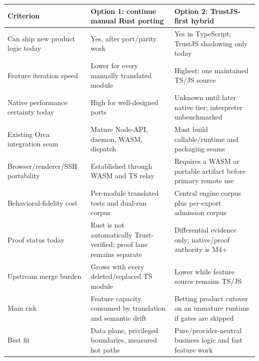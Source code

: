 \documentclass[
  10pt,
  letterpaper,
]{article}
\newcounter{none} %
\begin{document}
{\def\LTcaptype{none} %
\begin{longtable}[]{@{}
  >{\raggedright\arraybackslash}p{}
  >{\raggedright\arraybackslash}p{}
  >{\raggedright\arraybackslash}p{}@{}}
\toprule\noalign{}
\rowcolor{accent!12}
\begin{minipage}[b]{\linewidth}\raggedright
Criterion
\end{minipage} & \begin{minipage}[b]{\linewidth}\raggedright
Option 1: continue manual Rust porting
\end{minipage} & \begin{minipage}[b]{\linewidth}\raggedright
Option 2: TrustJS-first hybrid
\end{minipage} \\
\midrule\noalign{}
\endhead
\bottomrule\noalign{}
\endlastfoot
Can ship new product logic today & Yes, after port/parity work & Yes in
TypeScript; TrustJS shadowing only today \\
Feature iteration speed & Lower for every manually translated module &
Highest: one maintained TS/JS source \\
Native performance certainty today & High for well-designed ports &
Unknown until later native tier; interpreter unbenchmarked \\
Existing Orca integration seam & Mature Node-API, daemon, WASM, dispatch
& Must build callable/runtime and packaging seams \\
Browser/renderer/SSH portability & Established through WASM and TS relay
& Requires a WASM or portable artifact before primary remote use \\
Behavioral-fidelity cost & Per-module translated tests and dual-run
corpus & Central engine corpus plus per-export admission corpus \\
Proof status today & Rust is not automatically Trust-verified; proof
lane remains separate & Differential evidence only; native/proof
authority is M4+ \\
Upstream merge burden & Grows with every deleted/replaced TS module &
Lower while feature source remains TS/JS \\
Main risk & Feature capacity consumed by translation and semantic drift
& Betting product cutover on an immature runtime if gates are skipped \\
Best fit & Data plane, privileged boundaries, measured hot paths &
Pure/provider-neutral business logic and fast feature work \\
\end{longtable}
}
\end{document}
